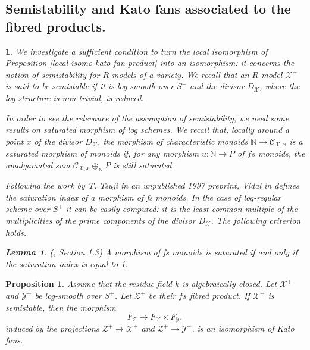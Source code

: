 \documentclass{amsart}%
\numberwithin{equation}{subsection}
\theoremstyle{plain2}
\newtheorem{lemma}[equation]{Lemma}
\newtheorem{prop}[equation]{Proposition}
\theoremstyle{definition2}
\theoremstyle{stepstyle}
\theoremstyle{point}
\theoremstyle{subpoint}
\newtheorem{subpoint}[equation]{}%
\newcommand{\spa}[1]{\begin{subpoint}#1\end{subpoint}}           %
\newcommand{\N}{\ensuremath{\mathbb{N}}}
\newcommand{\cX}{\ensuremath{\mathscr{X}}}
\newcommand{\caC}{\ensuremath{\mathcal{C}}}
\newcommand{\cY}{\ensuremath{\mathscr{Y}}}
\newcommand{\cZ}{\ensuremath{\mathscr{Z}}}
\renewcommand{\cZ}{\ensuremath{\mathscr{Z}}}
\renewcommand{\cY}{\ensuremath{\mathscr{Y}}}
\begin{document}
\subsection{Semistability and Kato fans associated to the fibred products.} 
\spa{We investigate a sufficient condition to turn the local isomorphism of Proposition \ref{local isomo kato fan product} into an isomorphism: it concerns the notion of semistability for $R$-models of a variety. We recall that an $R$-model $\cX^+$ is said to be semistable if it is log-smooth over $S^+$ and the divisor $D_{\cX}$, where the log structure is non-trivial, is reduced.

In order to see the relevance of the assumption of semistability, we need some results on saturated morphism of log schemes. We recall that, locally around a point $x$ of the divisor $D_{\cX}$, the morphism of characteristic monoids $\N \rightarrow \caC_{\cX,x}$ is a saturated morphism of monoids if, for any morphism $u: \N \rightarrow P$ of $fs$ monoids, the amalgamated sum $\caC_{\cX,x} \oplus_{\N} P$ is still saturated.

Following the work by T. Tsuji in an unpublished 1997 preprint, Vidal in \cite{Vidal} defines the saturation index of a morphism of \emph{fs} monoids. In the case of log-regular scheme over $S^+$ it can be easily computed: it is the least common multiple of the multiplicities of the prime components of the divisor $D_{\cX}$. The following criterion holds.
\begin{lemma} \label{lemma criterion saturation}(\cite{Vidal}, Section 1.3)
A morphism of fs monoids is saturated if and only if the saturation index is equal to 1.
\end{lemma}}


\begin{prop} \label{prop semistability and iso Kato fans}
Assume that the residue field $k$ is algebraically closed. Let $\cX^+$ and $\cY^+$ be log-smooth over $S^+$. Let $\cZ^+$ be their $fs$ fibred product. If $\cX^+$ is semistable, then the morphism $$F_{\cZ}\xrightarrow{} F_{\cX} \times F_{\cY},$$ induced by the projections $\cZ^+ \rightarrow \cX^+$ and $\cZ^+ \rightarrow \cY^+$, is an isomorphism of Kato fans.
\end{prop}
\end{document}
